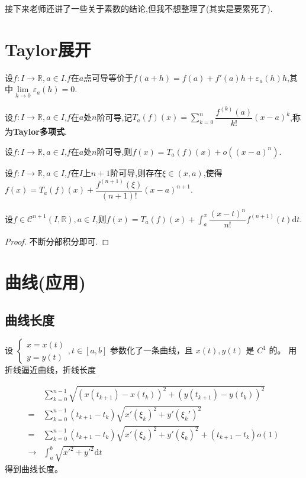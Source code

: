 接下来老师还讲了一些关于素数的结论,但我不想整理了(其实是要累死了).

\section{Taylor展开}

\begin{lem}
    设$f:I\to\mathbb{R},a\in I$.$f$在$a$点可导等价于$f(a+h)=f(a)+f'(a)h+\varepsilon_a(h)h$,其中$\lim\limits_{h\to0}\varepsilon_a(h)=0$.
\end{lem}

\begin{deff}
    设$f:I\to\mathbb{R},a\in I$,$f$在$a$处$n$阶可导,记$T_a(f)(x)=\sum\limits_{k=0}^n\dfrac{f^{(k)}(a)}{k!}(x-a)^k$,称为\textbf{Taylor多项式}.
\end{deff}

\begin{thm}
    设$f:I\to\mathbb{R},a\in I$,$f$在$a$处$n$阶可导,则$f(x)=T_a(f)(x)+o((x-a)^n)$.
\end{thm}

\begin{thm}
    设$f:I\to\mathbb{R},a\in I$,$f$在$I$上$n+1$阶可导,则存在$\xi\in(x,a)$,使得$f(x)=T_a(f)(x)+\dfrac{f^{(n+1)}(\xi)}{(n+1)!}(x-a)^{n+1}$.
\end{thm}

\begin{thm}
    设$f\in\mathcal{C}^{n+1}(I,\mathbb{R}),a\in I$,则$f(x)=T_a(f)(x)+\int_a^x\dfrac{(x-t)^n}{n!}f^{(n+1)}(t)\mathrm{d}t$.
\end{thm}

\begin{proof}
    不断分部积分即可.
\end{proof}

\section{曲线(应用)}

\subsection*{曲线长度}

设 $\begin{cases}
    x=x(t) \\
    y=y(t)
\end{cases}, t\in[a, b]$ 参数化了一条曲线，且 $x(t),y(t)$ 是 $C^1$ 的。
用折线逼近曲线，折线长度

\begin{align*}
    &\sum_{k=0}^{n-1}\sqrt{\left(x(t_{k+1})-x(t_k)\right)^2+\left(y(t_{k+1})-y(t_k)\right)^2}\\
    =&\sum_{k=0}^{n-1}\left(t_{k+1}-t_k\right)\sqrt{x'\left(\xi_k\right)^2+y'\left(\xi_k'\right)^2}\\
    =&\sum_{k=0}^{n-1}\left(t_{k+1}-t_k\right)\sqrt{x'\left(\xi_k\right)^2+y'\left(\xi_k\right)^2}+\left(t_{k+1}-t_k\right) o(1)\\
    \rightarrow&\int_a^b\sqrt{x'^2+y'^2}\mathrm dt
\end{align*}
得到曲线长度。

